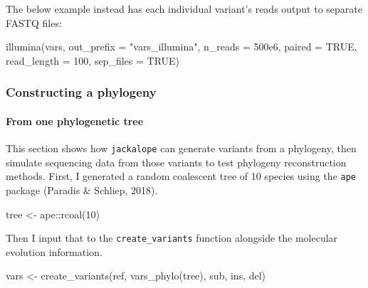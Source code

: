 \documentclass[12pt,]{article}
\newenvironment{Shaded}{}{}
\newcommand{\DataTypeTok}[1]{#1}
\newcommand{\DecValTok}[1]{#1}
\newcommand{\FloatTok}[1]{#1}
\newcommand{\KeywordTok}[1]{\textcolor[rgb]{0.00,0.00,1.00}{#1}}
\newcommand{\NormalTok}[1]{#1}
\newcommand{\OperatorTok}[1]{#1}
\newcommand{\OtherTok}[1]{\textcolor[rgb]{1.00,0.25,0.00}{#1}}
\newcommand{\StringTok}[1]{\textcolor[rgb]{0.00,0.50,0.50}{#1}}
\let\oldparagraph\paragraph
\renewcommand{\paragraph}[1]{\oldparagraph{#1}\mbox{}}
\begin{document}
The below example instead has each individual variant's reads output to separate
FASTQ files:

\begin{Shaded}
\begin{Highlighting}[]
\KeywordTok{illumina}\NormalTok{(vars, }\DataTypeTok{out_prefix =} \StringTok{"vars_illumina"}\NormalTok{, }\DataTypeTok{n_reads =} \FloatTok{500e6}\NormalTok{, }\DataTypeTok{paired =} \OtherTok{TRUE}\NormalTok{,}
         \DataTypeTok{read_length =} \DecValTok{100}\NormalTok{, }\DataTypeTok{sep_files =} \OtherTok{TRUE}\NormalTok{)}
\end{Highlighting}
\end{Shaded}

\hypertarget{constructing-a-phylogeny}{%
\subsubsection{Constructing a phylogeny}\label{constructing-a-phylogeny}}

\hypertarget{from-one-phylogenetic-tree}{%
\paragraph{From one phylogenetic tree}\label{from-one-phylogenetic-tree}}

This section shows how \texttt{jackalope} can generate variants from a phylogeny, then
simulate sequencing data from those variants to test phylogeny reconstruction methods.
First, I generated a random coalescent tree of 10 species using the \texttt{ape} package
(Paradis \& Schliep, 2018).

\begin{Shaded}
\begin{Highlighting}[]
\NormalTok{tree <-}\StringTok{ }\NormalTok{ape}\OperatorTok{::}\KeywordTok{rcoal}\NormalTok{(}\DecValTok{10}\NormalTok{)}
\end{Highlighting}
\end{Shaded}

Then I input that to the \texttt{create\_variants} function alongside the molecular evolution
information.

\begin{Shaded}
\begin{Highlighting}[]
\NormalTok{vars <-}\StringTok{ }\KeywordTok{create_variants}\NormalTok{(ref, }\KeywordTok{vars_phylo}\NormalTok{(tree), sub, ins, del)}
\end{Highlighting}
\end{Shaded}
\end{document}
